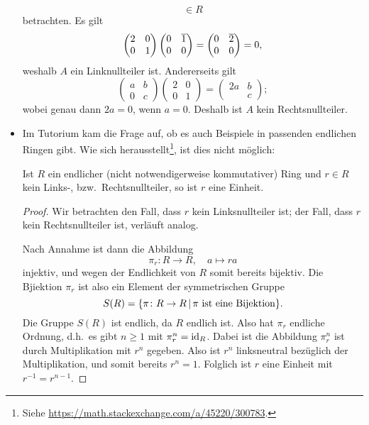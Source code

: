 \begin{itemize}
\[      \in       R
    \]
    betrachten.
    Es gilt
    \[
        \begin{pmatrix}
          2 & 0 \\
          0 & 1
        \end{pmatrix}
        \begin{pmatrix}
          0 & \overline{1} \\
          0 & 0
        \end{pmatrix}
      = \begin{pmatrix}
          0 & \overline{2} \\
          0 & 0
        \end{pmatrix}
      = 0,
    \]
    weshalb $A$ ein Linknullteiler ist.
    Andererseits gilt
    \[
        \begin{pmatrix}
          a & b \\
          0 & c
        \end{pmatrix}
        \begin{pmatrix}
          2 & 0 \\
          0 & 1
        \end{pmatrix}
      = \begin{pmatrix}
          2a  & b \\
              & c
        \end{pmatrix};
    \]
    wobei genau dann $2a = 0$, wenn $a = 0$.
    Deshalb ist $A$ kein Rechtsnullteiler.
    
  \item
    Im Tutorium kam die Frage auf, ob es auch Beispiele in passenden endlichen Ringen gibt.
    Wie sich herausstellt\footnote{Siehe \url{https://math.stackexchange.com/a/45220/300783}.}, ist dies nicht möglich:
    
    \begin{lemma}
      Ist $R$ ein endlicher \textup(nicht notwendigerweise kommutativer\textup) Ring und $r \in R$ kein Links-, bzw.\ Rechtsnullteiler, so ist $r$ eine Einheit.
    \end{lemma}
    
    \begin{proof}
      Wir betrachten den Fall, dass $r$ kein Linksnullteiler ist;
      der Fall, dass $r$ kein Rechtsnullteiler ist, verläuft analog.
      
      Nach Annahme ist dann die Abbildung
      \[
                \pi_r
        \colon  R
        \to     R,
        \quad   a
        \mapsto ra
      \]
      injektiv, und wegen der Endlichkeit von $R$ somit bereits bijektiv.
      Die Bjiektion $\pi_r$ ist also ein Element der symmetrischen Gruppe
      \[
          S(R)
        = \{
            \pi \colon R \to R
          \suchthat
          \text{$\pi$ ist eine Bijektion}
          \}.
      \]
      Die Gruppe $S(R)$ ist endlich, da $R$ endlich ist.
      Also hat $\pi_r$ endliche Ordnung, d.h.\ es gibt $n \geq 1$ mit $\pi_r^n = \operatorname{id}_R$.
      Dabei ist die Abbildung $\pi_r^n$ ist durch Multiplikation mit $r^n$ gegeben.
      Also ist $r^n$ linksneutral bezüglich der Multiplikation, und somit bereits $r^n = 1$.
      Folglich ist $r$ eine Einheit mit $r^{-1} = r^{n-1}$.
    \end{proof}


\end{itemize}
